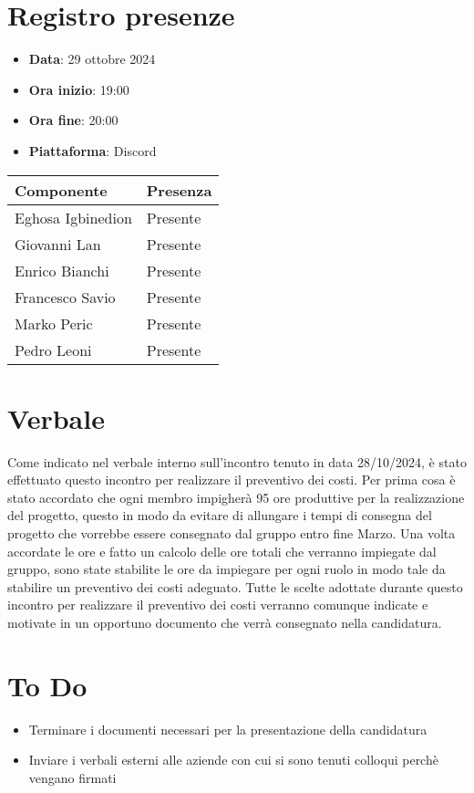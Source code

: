 \documentclass[a4paper, 12pt]{article}
\begin{document}
\section{Registro presenze}
\begin{itemize}
    \item[] \textbf{Data}: 29 ottobre 2024
    \item[] \textbf{Ora inizio}:  19:00
    \item[] \textbf{Ora fine}: 20:00
    \item[] \textbf{Piattaforma}: Discord	
\end{itemize}
\begin{table}[!h]
\centering
{\renewcommand{\arraystretch}{2}
\begin{tabularx}{\textwidth}{| X | X |}
    \hline
        \textbf{\large Componente} & 
        \textbf{\large Presenza} \\ 
    \hline 
    \hline
        Eghosa Igbinedion&
        Presente \\
    \hline 
        Giovanni Lan&
        Presente \\
    \hline 
        Enrico Bianchi&
        Presente \\
    \hline 
        Francesco Savio&
        Presente \\
    \hline 
        Marko Peric&
        Presente \\
    \hline 
        Pedro Leoni&
        Presente \\
    \hline 

\end{tabularx}}
\end{table}

\newpage

\section{Verbale}
Come indicato nel verbale interno sull'incontro tenuto in data 28/10/2024, è stato effettuato questo incontro per realizzare il preventivo dei costi.
Per prima cosa è stato accordato che ogni membro impigherà 95 ore produttive per la realizzazione del progetto, questo in modo da evitare di allungare i tempi di consegna del progetto che vorrebbe essere consegnato dal gruppo entro fine Marzo.
Una volta accordate le ore e fatto un calcolo delle ore totali che verranno impiegate dal gruppo, sono state stabilite le ore da impiegare per ogni ruolo in modo tale da stabilire un preventivo dei costi adeguato.
Tutte le scelte adottate durante questo incontro per realizzare il preventivo dei costi verranno comunque indicate e motivate in un opportuno documento che verrà consegnato nella candidatura.
\section{To Do}
\begin{itemize}
    \item Terminare i documenti necessari per la presentazione della candidatura
    \item Inviare i verbali esterni alle aziende con cui si sono tenuti colloqui perchè vengano firmati
\end{itemize}
\end{document}
